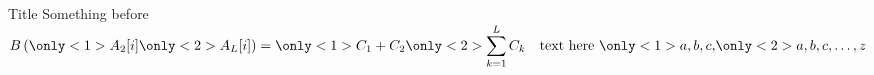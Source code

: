 \documentclass{beamer}
\begin{document}
\begin{frame}{Title}
Something before\\
\bigskip
$%
B\left(%
\only<1>{A_2[i]}%
\only<2>{A_L[i]}%
\right) =%
\only<1>{C_1 + C_2 \vphantom{\displaystyle\sum_{k=1}^{L} C_k}}%
\only<2>{\displaystyle\sum_{k=1}^{L} C_k}%
\quad \text{text here }%
\only<1>{a,b,c,}%
\only<2>{a,b,c,\ldots,z}
$

\end{frame}
\end{document}
